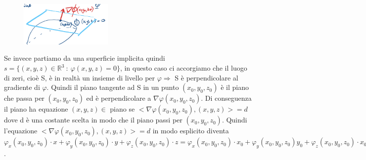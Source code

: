 \begin{figure}
    \vspace{-10pt}
    \centering
    \includegraphics[width=4.5cm]{images/sup-implicita.png}
\end{figure}
Se invece partiamo da una superficie implicita quindi $s = \{(x,y,z) \in \mathbb{R}^3 \::\: \varphi(x,y,z) = 0\}$, in questo caso ci accorgiamo che il luogo di zeri, cioè S, è in realtà un insieme di livello per $\varphi \Longrightarrow$ S è perpendicolare al gradiente di $\varphi$. Quindi il piano tangente ad S in un punto $(x_0,y_0,z_0)$ è il piano che passa per $(x_0,y_0,z_0)$ ed è perpendicolare a $\nabla \varphi(x_0,y_0,z_0)$. Di conseguenza il piano ha equazione $(x,y,z) \in$ piano se $<\nabla \varphi(x_0,y_0,z_0),(x,y,z)> = d$ dove d è una costante scelta in modo che il piano passi per $(x_0,y_0,z_0)$. Quindi l'equazione $<\nabla \varphi(x_0,y_0,z_0),(x,y,z)> = d$ in modo esplicito diventa $\varphi_x (x_0,y_0,z_0) \cdot x + \varphi_y(x_0,y_0,z_0) \cdot y + \varphi_z(x_0,y_0,z_0) \cdot z = \varphi_x (x_0,y_0,z_0) \cdot x_0 + \varphi_y (x_0,y_0,z_0)y_0 + \varphi_z (x_0,y_0,z_0) \cdot x_0$.